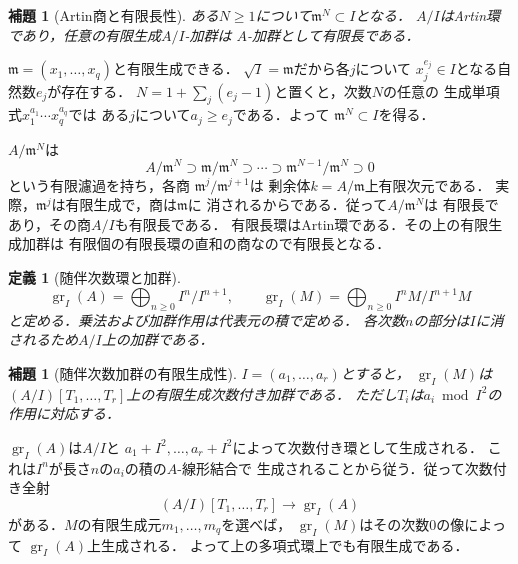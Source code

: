 \documentclass[a5paper,10pt,onecolumn]{jsarticle}
\makeatletter
\theoremstyle{mathnotetheorem}
\newtheorem{definition}[theorem]{定義}
\newtheorem{lemma}[theorem]{補題}
\renewcommand{\proofname}{証明}
\renewenvironment{proof}[1][\proofname]{%
  \par\pushQED{\qed}\normalfont\topsep4\p@\@plus2\p@\relax
  \trivlist\item[\hskip\labelsep\bfseries #1]\ignorespaces
}{\popQED\endtrivlist\@endpefalse}
\makeatother
\begin{document}
\begin{lemma}[Artin商と有限長性]\label{lem:artin}
ある$N\ge1$について$\mathfrak m^N\subset I$となる．
$A/I$はArtin環であり，任意の有限生成$A/I$-加群は
$A$-加群として有限長である．
\end{lemma}
\begin{proof}
$\mathfrak m=(x_1,\ldots,x_q)$と有限生成できる．
$\sqrt I=\mathfrak m$だから各$j$について
$x_j^{e_j}\in I$となる自然数$e_j$が存在する．
$N=1+\sum_j(e_j-1)$と置くと，次数$N$の任意の
生成単項式$x_1^{a_1}\cdots x_q^{a_q}$では
ある$j$について$a_j\ge e_j$である．よって
$\mathfrak m^N\subset I$を得る．

$A/\mathfrak m^N$は
\[
 A/\mathfrak m^N\supset\mathfrak m/\mathfrak m^N
 \supset\cdots\supset\mathfrak m^{N-1}/\mathfrak m^N
 \supset0
\]
という有限濾過を持ち，各商
$\mathfrak m^j/\mathfrak m^{j+1}$は
剰余体$k=A/\mathfrak m$上有限次元である．
実際，$\mathfrak m^j$は有限生成で，商は$\mathfrak m$に
消されるからである．従って$A/\mathfrak m^N$は
有限長であり，その商$A/I$も有限長である．
有限長環はArtin環である．その上の有限生成加群は
有限個の有限長環の直和の商なので有限長となる．
\end{proof}

\begin{definition}[随伴次数環と加群]
\[
 \operatorname{gr}_I(A)=\bigoplus_{n\ge0}I^n/I^{n+1},
 \qquad
 \operatorname{gr}_I(M)=\bigoplus_{n\ge0}I^nM/I^{n+1}M
\]
と定める．乗法および加群作用は代表元の積で定める．
各次数$n$の部分は$I$に消されるため$A/I$上の加群である．
\end{definition}

\begin{lemma}[随伴次数加群の有限生成性]\label{lem:gr}
$I=(a_1,\ldots,a_r)$とすると，
$\operatorname{gr}_I(M)$は
$(A/I)[T_1,\ldots,T_r]$上の有限生成次数付き加群である．
ただし$T_i$は$a_i\bmod I^2$の作用に対応する．
\end{lemma}
\begin{proof}
$\operatorname{gr}_I(A)$は$A/I$と
$a_1+I^2,\ldots,a_r+I^2$によって次数付き環として生成される．
これは$I^n$が長さ$n$の$a_i$の積の$A$-線形結合で
生成されることから従う．従って次数付き全射
\[
 (A/I)[T_1,\ldots,T_r]\longrightarrow
 \operatorname{gr}_I(A)
\]
がある．$M$の有限生成元$m_1,\ldots,m_q$を選べば，
$\operatorname{gr}_I(M)$はその次数0の像によって
$\operatorname{gr}_I(A)$上生成される．
よって上の多項式環上でも有限生成である．
\end{proof}
\end{document}
